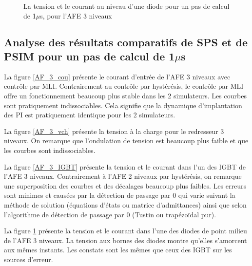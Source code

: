 \begin{figure}[htb]
\caption{La tension et le courant au niveau d'une diode pour un pas de calcul de 1$\mu$s, pour l'AFE 3 niveaux}
\label{AF_3_DIODE}
\end{figure}


\clearpage

\subsection{Analyse des résultats comparatifs de SPS et de PSIM pour un pas de calcul de 1$\mu$s}
La figure \ref{AF_3_cou} présente le courant d'entrée de l'AFE 3 niveaux avec contrôle par MLI. Contrairement au contrôle par hystérésis, le contrôle par MLI offre un fonctionnement beaucoup plus stable dans les 2 simulateurs. Les courbes sont pratiquement indissociables. Cela signifie que la dynamique d'implantation des PI est pratiquement identique pour les 2 simulateurs.

La figure \ref{AF_3_vch} présente la tension à la charge pour le redresseur 3 niveaux. On remarque que l'ondulation de tension est beaucoup plus faible et que les courbes sont indissociables. 

La figure \ref{AF_3_IGBT} présente la tension et le courant dans l'un des IGBT de l'AFE 3 niveaux. Contrairement à l'AFE 2 niveaux par hystérésis, on remarque une superposition des courbes et des décalages beaucoup plus faibles. Les erreurs sont minimes et causées par la détection de passage par 0 qui varie suivant la méthode de solution (équations d'états ou matrice d'admittances) ainsi que selon l'algorithme de détection de passage par 0 (Tustin ou trapézoïdal pur).

La figure \ref{AF_3_DIODE} présente la tension et le courant dans l'une des diodes de point milieu de l'AFE 3 niveaux. La tension aux bornes des diodes montre qu'elles s'amorcent aux mêmes instants. Les constats sont les mêmes que ceux des IGBT sur les sources d'erreur. 
